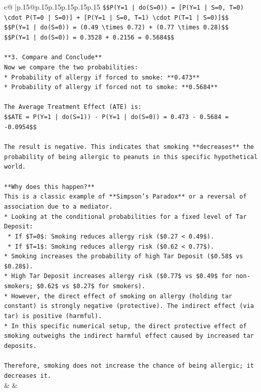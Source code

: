 \documentclass{article}
\begin{document}
{\begin{supertabular}{c@{$\;$}|p{.15\linewidth}@{}p{.15\linewidth}p{.15\linewidth}p{.15\linewidth}p{.15\linewidth}p{.15\linewidth}}
{{{\texttt{\$\$P(Y=1 | do(S=0)) = {[}P(Y=1 | S=0, T=0) \textbackslash{}cdot P(T=0 | S=0){]} + {[}P(Y=1 | S=0, T=1) \textbackslash{}cdot P(T=1 | S=0){]}\$\$} \\
\texttt{\$\$P(Y=1 | do(S=0)) = (0.49 \textbackslash{}times 0.72) + (0.77 \textbackslash{}times 0.28)\$\$} \\
\texttt{\$\$P(Y=1 | do(S=0)) = 0.3528 + 0.2156 = 0.5684\$\$} \\
\\ 
\texttt{**3. Compare and Conclude**} \\
\texttt{Now we compare the two probabilities:} \\
\texttt{*   Probability of allergy if forced to smoke: **0.473**} \\
\texttt{*   Probability of allergy if forced not to smoke: **0.5684**} \\
\\ 
\texttt{The Average Treatment Effect (ATE) is:} \\
\texttt{\$\$ATE = P(Y=1 | do(S=1)) {-} P(Y=1 | do(S=0)) = 0.473 {-} 0.5684 = {-}0.0954\$\$} \\
\\ 
\texttt{The result is negative. This indicates that smoking **decreases** the probability of being allergic to peanuts in this specific hypothetical world.} \\
\\ 
\texttt{**Why does this happen?**} \\
\texttt{This is a classic example of **Simpson's Paradox** or a reversal of association due to a mediator.} \\
\texttt{*   Looking at the conditional probabilities for a fixed level of Tar Deposit:} \\
\texttt{    *   If \$T=0\$: Smoking reduces allergy risk (\$0.27 < 0.49\$).} \\
\texttt{    *   If \$T=1\$: Smoking reduces allergy risk (\$0.62 < 0.77\$).} \\
\texttt{*   Smoking increases the probability of high Tar Deposit (\$0.58\$ vs \$0.28\$).} \\
\texttt{*   High Tar Deposit increases allergy risk (\$0.77\$ vs \$0.49\$ for non{-}smokers; \$0.62\$ vs \$0.27\$ for smokers).} \\
\texttt{*   However, the direct effect of smoking on allergy (holding tar constant) is strongly negative (protective). The indirect effect (via tar) is positive (harmful).} \\
\texttt{*   In this specific numerical setup, the direct protective effect of smoking outweighs the indirect harmful effect caused by increased tar deposits.} \\
\\ 
\texttt{Therefore, smoking does not increase the chance of being allergic; it decreases it.} \\
            }
        }
    }
    & & \\ \\


\end{supertabular}}
\end{document}
